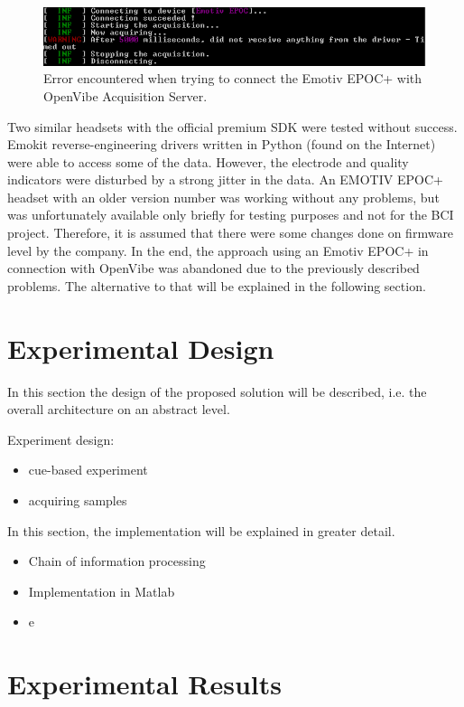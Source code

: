 \documentclass[a4paper,twoside, openright,12pt]{report}
\begin{document}
\begin{figure}[h]
	\centering
	\includegraphics[width=0.8\linewidth]{./gfx/epoc_errorcode}
	\caption{Error encountered when trying to connect the Emotiv EPOC+ with OpenVibe Acquisition Server.}
	\label{fig:epoc_error}
\end{figure}

Two similar headsets with the official premium SDK were tested without success. Emokit reverse-engineering drivers written in Python (found on the Internet) were able to access some of the data. However, the electrode and quality indicators were disturbed by a strong jitter in the data. An EMOTIV EPOC+ headset with an older version number was working without any problems, but was unfortunately available only briefly for testing purposes and not for the BCI project. Therefore, it is assumed that there were some changes done on firmware level by the company. In the end, the approach using an Emotiv EPOC+ in connection with OpenVibe was abandoned due to the previously described problems. The alternative to that will be explained in the following section.




\section{Experimental Design}
In this section the design of the proposed solution will be described, i.e. the overall architecture on an abstract level. 

Experiment design:
\begin{itemize}
	\item cue-based experiment
	\item acquiring samples 
\end{itemize}

In this section, the implementation will be explained in greater detail. 
\begin{itemize}
	\item Chain of information processing
	\item Implementation in Matlab
	\item e
\end{itemize}


\section{Experimental Results}
\end{document}
